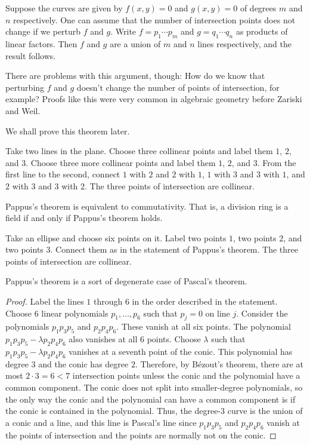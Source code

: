 \documentclass [11 pt, oneside] {article}
\begin{document}
Suppose the curves are given by $f(x,y)=0$ and $g(x,y)=0$ of degrees $m$ and $n$ respectively. One can assume that the number of intersection points does not change if we perturb $f$ and $g$. Write $f=p_1\cdots p_m$ and $g = q_1\cdots q_n$ as products of linear factors. Then $f$ and $g$ are a union of $m$ and $n$ lines respectively, and the result follows.

There are problems with this argument, though: How do we know that perturbing $f$ and $g$ doesn't change the number of points of intersection, for example? Proofs like this were very common in algebraic geometry before Zariski and Weil.

We shall prove this theorem later.

\begin{theorem}[Pappus]\label{}
Take two lines in the plane. Choose three collinear points and label them $1$, $2$, and $3$. Choose three more collinear points and label them $1$, $2$, and $3$. From the first line to the second, connect $1$ with $2$ and $2$ with $1$, $1$ with $3$ and $3$ with $1$, and $2$ with $3$ and $3$ with $2$. The three points of intersection are collinear.
\end{theorem}

\begin{remark}
	Pappus's theorem is equivalent to commutativity. That is, a division ring is a field if and only if Pappus's theorem holds.
\end{remark}

\begin{theorem}[Pascal]\label{}
Take an ellipse and choose six points on it. Label two points $1$, two points $2$, and two points $3$. Connect them as in the statement of Pappus's theorem. The three points of intersection are collinear. 
\end{theorem}

\begin{remark}
	Pappus's theorem is a sort of degenerate case of Pascal's theorem.
\end{remark}

\begin{proof}
Label the lines $1$ through $6$ in the order described in the statement. Choose $6$ linear polynomials $p_1,\hdots, p_{6}$ such that $p_j = 0$ on line $j$. Consider the polynomials $p_1p_3p_5$ and $p_2p_4p_6$. These vanish at all six points. The polynomial $p_1p_3p_5 - \lambda p_2p_4p_6$ also vanishes at all $6$ points. Choose $\lambda$ such that $p_1p_3p_5 - \lambda p_2p_4p_6$ vanishes at a seventh point of the conic. This polynomial has degree $3$ and the conic has degree $2$. Therefore, by B\'ezout's theorem, there are at most $2\cdot 3 = 6<7$ intersection points unless the conic and the polynomial have a common component. The conic does not split into smaller-degree polynomials, so the only way the conic and the polynomial can have a common component is if the conic is contained in the polynomial. Thus, the degree-$3$ curve is the union of a conic and a line, and this line is Pascal's line since $p_1p_3p_5$ and $p_2p_4p_6$ vanish at the points of intersection and the points are normally not on the conic. 
\end{proof}
\end{document}

